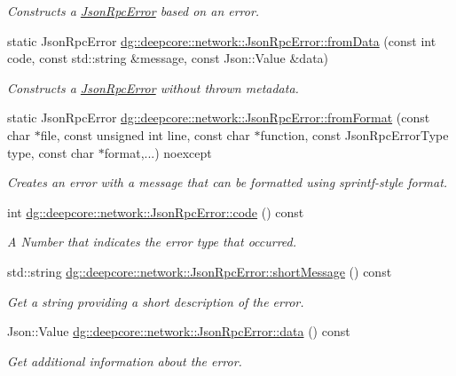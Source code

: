 \begin{DoxyCompactItemize}
\begin{DoxyCompactList}\small\item\em Constructs a \hyperlink{classdg_1_1deepcore_1_1network_1_1_json_rpc_error}{Json\+Rpc\+Error} based on an error. \end{DoxyCompactList}\item 
static Json\+Rpc\+Error \hyperlink{group___network_module_gaef99638ab60920c9af55d3c15349119f}{dg\+::deepcore\+::network\+::\+Json\+Rpc\+Error\+::from\+Data} (const int code, const std\+::string \&message, const Json\+::\+Value \&data)
\begin{DoxyCompactList}\small\item\em Constructs a \hyperlink{classdg_1_1deepcore_1_1network_1_1_json_rpc_error}{Json\+Rpc\+Error} without thrown metadata. \end{DoxyCompactList}\item 
static Json\+Rpc\+Error \hyperlink{group___network_module_ga2fdfe2154c20e91cb5f0205ced658714}{dg\+::deepcore\+::network\+::\+Json\+Rpc\+Error\+::from\+Format} (const char $\ast$file, const unsigned int line, const char $\ast$function, const Json\+Rpc\+Error\+Type type, const char $\ast$format,...) noexcept
\begin{DoxyCompactList}\small\item\em Creates an error with a message that can be formatted using sprintf-\/style format. \end{DoxyCompactList}\item 
int \hyperlink{group___network_module_gab5f760ae09f901ed94e08ea1c0d26e50}{dg\+::deepcore\+::network\+::\+Json\+Rpc\+Error\+::code} () const 
\begin{DoxyCompactList}\small\item\em A Number that indicates the error type that occurred. \end{DoxyCompactList}\item 
std\+::string \hyperlink{group___network_module_gab4cfbb46ab5f2ce706d08b5daf106263}{dg\+::deepcore\+::network\+::\+Json\+Rpc\+Error\+::short\+Message} () const 
\begin{DoxyCompactList}\small\item\em Get a string providing a short description of the error. \end{DoxyCompactList}\item 
Json\+::\+Value \hyperlink{group___network_module_ga30e099cc04ea022587d643d2c93bb0e9}{dg\+::deepcore\+::network\+::\+Json\+Rpc\+Error\+::data} () const 
\begin{DoxyCompactList}\small\item\em Get additional information about the error. \end{DoxyCompactList}\item 

\end{DoxyCompactItemize}
